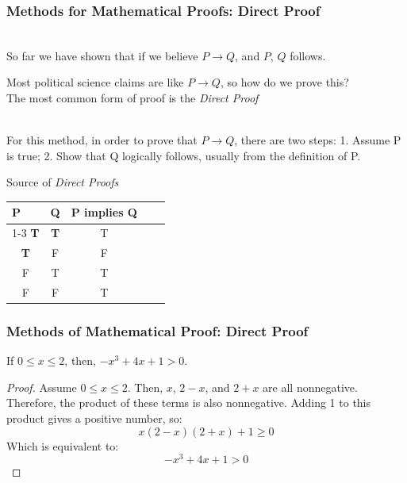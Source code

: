 \documentclass[aspectratio=169, handout]{beamer}
\numberwithin{equation}{section}
\begin{document}
\begin{frame}
\frametitle{Methods for Mathematical Proofs: Direct Proof}

\ \\So far we have shown that if we believe $P \rightarrow Q$, and $P$, $Q$ follows.

Most political science claims are like $P \rightarrow Q$, so how do we prove this?  \\

The most common form of proof is the \emph{Direct Proof} \pause

\ \\For this method, in order to prove that $P \rightarrow Q$, there are two steps: 1. Assume P is true; 2. Show that Q logically follows, usually from the definition of P. \pause

\end{frame}

\begin{frame}{Source of \emph{Direct Proofs}}

\begin{table}[]
\begin{tabular}{cccll}
\multicolumn{1}{l}{P} & \multicolumn{1}{l}{Q} & \multicolumn{1}{l}{P implies Q} &  &  \\ \cline{1-3}
\textbf{T}                     & \textbf{T}                      &T                             &  &  \\
\textbf{T}                     & F                     & F                               &  &  \\
F                     & T                     & T                             &  &  \\
F                     & F                     & T                             &  & 
\end{tabular}
\end{table} 
\end{frame}


\begin{frame}
\frametitle{Methods of Mathematical Proof: Direct Proof}

\begin{theorem}
If $0 \leq x \leq 2$, then, $- x^{3} + 4x + 1 > 0$.
\end{theorem} \pause

\begin{proof}
Assume $0 \leq x \leq 2$. \pause
Then, $x$, $2 - x$, and $2 + x$ are all nonnegative. \pause
Therefore, the product of these terms is also nonnegative. Adding 1 to this product gives a positive number, so:
$$x (2 - x) (2 + x) + 1 \geq 0$$ \pause
Which is equivalent to:
$$- x^{3} + 4x + 1 > 0$$
\end{proof}

\end{frame}
\end{document}
